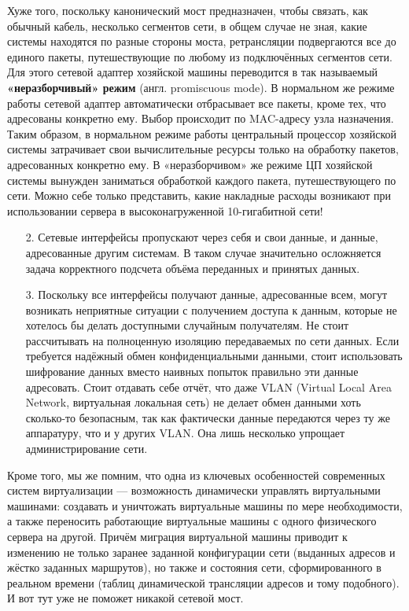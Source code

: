 \documentclass[14pt, a4paper]{article}
\begin{document}
    Хуже того, поскольку канонический мост предназначен, чтобы связать, как обычный кабель, несколько
сегментов сети, в общем случае не зная, какие системы находятся по разные стороны моста,
ретрансляции подвергаются все до единого пакеты, путешествующие по любому из подключённых
сегментов сети. Для этого сетевой адаптер хозяйской машины переводится в так называемый
\textbf{«неразборчивый» режим} (англ. promiscuous mode). В нормальном же режиме работы сетевой
адаптер автоматически отбрасывает все пакеты, кроме тех, что адресованы конкретно ему. Выбор
происходит по MAC-адресу узла назначения. Таким образом, в нормальном режиме работы
центральный процессор хозяйской системы затрачивает свои вычислительные ресурсы только на
обработку пакетов, адресованных конкретно ему. В «неразборчивом» же режиме ЦП хозяйской
системы вынужден заниматься обработкой каждого пакета, путешествующего по сети. Можно себе
только представить, какие накладные расходы возникают при использовании сервера в
высоконагруженной 10-гигабитной сети!
\begin{enumerate}
\item[2.] Сетевые интерфейсы пропускают через себя и свои данные, и данные, адресованные другим
системам. В таком случае значительно осложняется задача корректного подсчета объёма
переданных и принятых данных.
\item[3.] Поскольку все интерфейсы получают данные, адресованные всем, могут возникать
неприятные ситуации с получением доступа к данным, которые не хотелось бы делать
доступными случайным получателям. Не стоит рассчитывать на полноценную изоляцию
передаваемых по сети данных. Если требуется надёжный обмен конфиденциальными
данными, стоит использовать шифрование данных вместо наивных попыток правильно эти
данные адресовать. Стоит отдавать себе отчёт, что даже VLAN (Virtual Local Area Network,
виртуальная локальная сеть) не делает обмен данными хоть сколько-то безопасным, так как
фактически данные передаются через ту же аппаратуру, что и у других VLAN. Она лишь
несколько упрощает администрирование сети.
\end{enumerate}

Кроме того, мы же помним, что одна из ключевых особенностей современных систем виртуализации
— возможность динамически управлять виртуальными машинами: создавать и уничтожать
виртуальные машины по мере необходимости, а также переносить работающие виртуальные машины
с одного физического сервера на другой. Причём миграция виртуальной машины приводит к
изменению не только заранее заданной конфигурации сети (выданных адресов и жёстко заданных
маршрутов), но также и состояния сети, сформированного в реальном времени (таблиц динамической
трансляции адресов и тому подобного). И вот тут уже не поможет никакой сетевой мост.\\
\end{document}
